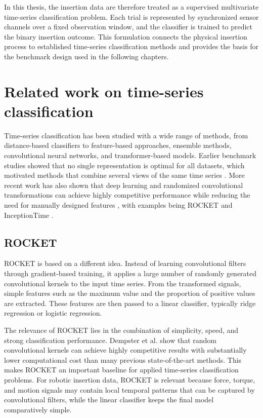 In this thesis, the insertion data are therefore treated as a supervised multivariate time-series classification problem. Each trial is represented by synchronized sensor channels over a fixed observation window, and the classifier is trained to predict the binary insertion outcome. This formulation connects the physical insertion process to established time-series classification methods and provides the basis for the benchmark design used in the following chapters.

\section{Related work on time-series classification}

Time-series classification has been studied with a wide range of methods, from distance-based classifiers to feature-based approaches, ensemble methods, convolutional neural networks, and transformer-based models. Earlier benchmark studies showed that no single representation is optimal for all datasets, which motivated methods that combine several views of the same time series \cite{bagnallGreatTimeSeries2017,dauUCRTimeSeries2019}. More recent work has also shown that deep learning and randomized convolutional transformations can achieve highly competitive performance while reducing the need for manually designed features \cite{fawazDeepLearningTime2019}, with examples being ROCKET \cite{dempsterROCKETExceptionallyFast2020} and InceptionTime \cite{ismailfawazInceptionTimeFindingAlexNet2020}.

\subsection{ROCKET \cite{dempsterROCKETExceptionallyFast2020}}

ROCKET is based on a different idea. Instead of learning convolutional filters through gradient-based training, it applies a large number of randomly generated convolutional kernels to the input time series. From the transformed signals, simple features such as the maximum value and the proportion of positive values are extracted. These features are then passed to a linear classifier, typically ridge regression or logistic regression.

The relevance of ROCKET lies in the combination of simplicity, speed, and strong classification performance. Dempster et al. show that random convolutional kernels can achieve highly competitive results with substantially lower computational cost than many previous state-of-the-art methods. This makes ROCKET an important baseline for applied time-series classification problems. For robotic insertion data, ROCKET is relevant because force, torque, and motion signals may contain local temporal patterns that can be captured by convolutional filters, while the linear classifier keeps the final model comparatively simple.

